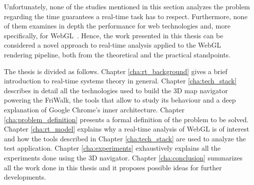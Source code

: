 Unfortunately, none of the studies mentioned in this section analyzes the problem
regarding the time guarantees a real-time task has to respect. Furthermore, none of them
examines in depth the performance for web technologies and, more specifically,
for WebGL~\cite{webgl}. Hence, the work presented in this thesis can be considered
a novel approach to real-time analysis applied to the WebGL rendering pipeline,
both from the theoretical and the practical standpoints.

The thesis is divided as follows. Chapter \ref{cha:rt_background}
gives a brief introduction to real-time systems theory in general. Chapter
\ref{cha:tech_stack} describes in detail all the technologies used to build the
3D map navigator powering the FriWalk, the tools that allow to study its
behaviour and a deep explanation of Google Chrome's
inner architecture. Chapter \ref{cha:problem_definition} presents a formal definition
of the problem to be solved. Chapter \ref{cha:rt_model}
explains why a real-time analysis of WebGL is of interest and how the tools
described in Chapter \ref{cha:tech_stack} are used to analyze the test application.
Chapter \ref{cha:experiments} exhaustively explains all the experiments done using
the 3D navigator. Chapter \ref{cha:conclusion} summarizes all the work
done in this thesis and it proposes possible ideas for further developments.
